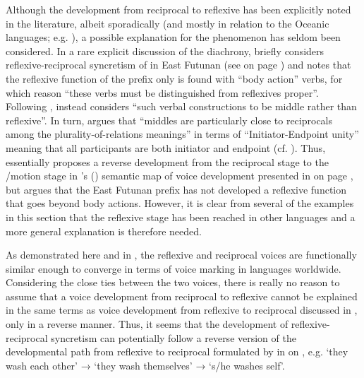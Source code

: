 Although the development from reciprocal to reflexive has been explicitly noted in the literature, albeit sporadically (and mostly in relation to the Oceanic languages; e.g. \citealt{moyse-faurie:2008, moyse-faurie:2017}), a possible explanation for the phenomenon has seldom been considered. In a rare explicit discussion of the diachrony, \citet[46f.]{lichtenberk:2000} briefly considers reflexive-reciprocal syncretism of  in East Futunan (see  on page \pageref{tab:ch7:recp-recp-oceanic}) and notes that the reflexive function of the prefix  only is found with “body action” verbs, for which reason “these verbs must be distinguished from reflexives proper”. Following \citet{kemmer:1993}, \citet[47]{lichtenberk:2000} instead considers “such verbal constructions to be middle rather than reflexive”. In turn, \citet[48]{lichtenberk:2000} argues that “middles are particularly close to reciprocals among the plurality-of-relations meanings” in terms of “Initiator-Endpoint unity” meaning that all participants are both initiator and endpoint (cf. \citealt[207ff.]{kemmer:1993}). Thus, \citet{lichtenberk:2000} essentially proposes a reverse development from the reciprocal stage to the /motion stage in \citeauthor{haspelmath:2003}’s (\citeyear{haspelmath:2003}) semantic map of voice development presented in  on page \pageref{fig:ch7:unidirectional}, but argues that the East Futunan prefix  has not developed a reflexive function that goes beyond body actions. However, it is clear from several of the examples in this section that the reflexive stage has been reached in other languages and a more general explanation is therefore needed.

As demonstrated here and in , the reflexive and reciprocal voices are functionally similar enough to converge in terms of voice marking in languages worldwide. Considering the close ties between the two voices, there is really no reason to assume that a voice development from reciprocal to reflexive cannot be explained in the same terms as voice development from reflexive to reciprocal discussed in , only in a reverse manner. Thus, it seems that the development of reflexive-reciprocal syncretism can potentially follow a reverse version of the developmental path from reflexive to reciprocal formulated by \citet{heine:miyashita:2008} in  on \pageref{fig:ch7:refl-recp}, e.g. ‘they wash each other’ → ‘they wash themselves’ → ‘s/he washes self’.

